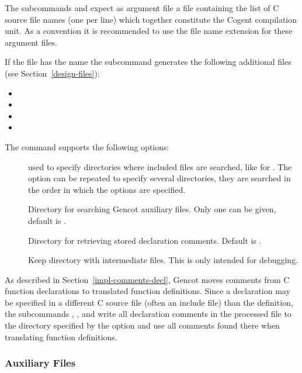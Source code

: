 The subcommands  and  expect as argument file a file containing the list of C source file names
(one per line) which together constitute the Cogent compilation unit. As a convention it is recommended to use the 
file name extension  for these argument files.

If the file has the name  the subcommand  generates the following additional files (see Section~\ref{design-files}):
\begin{itemize}
\item {}
\item {}
\item {}
\item {}
\end{itemize}

The  command supports the following options:
\begin{description}
\item[] used to specify directories where included files are searched, like for . The 
option can be repeated to specify several directories, they are searched in the order in which the options
are specified.

\item[] Directory for searching Gencot auxiliary files. Only one can be given, default is .

\item[] Directory for retrieving stored declaration comments. Default is .

\item[] Keep directory with intermediate files. This is only intended for debugging.

\end{description}

As described in Section~\ref{impl-comments-decl}, Gencot moves comments from C function declarations to translated function
definitions. Since a declaration may be specified in a different C source file (often an include file) than the definition, 
the subcommands , , and  write all declaration comments in the processed file to
the directory specified by the  option and use all comments found there when translating function definitions.

\subsubsection{Auxiliary Files}


